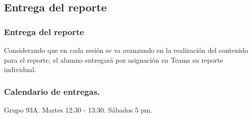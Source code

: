 \documentclass[14pt]{beamer}
\begin{document}
\subsection{Entrega del reporte}

\begin{frame}
\frametitle{Entrega del reporte}
Considerando que en cada sesión se va avanzando en la realización del contenido para el reporte, \pause el alumno entregará por asignación en Teams su reporte individual.
\end{frame}
\begin{frame}
\frametitle{Calendario de entregas.}
Grupo 93A. Martes 12:30 - 13:30. Sábados 5 pm.
\end{frame}
\end{document}
